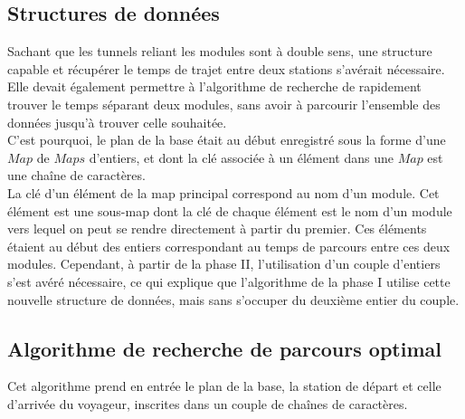 \documentclass[11pt, a4paper, twoside, titlepage]{article}
\begin{document}
\subsection{Structures de données}

Sachant que les tunnels reliant les modules sont à double sens, une structure capable et récupérer le temps de trajet entre deux stations s'avérait nécessaire. Elle devait également permettre à l'algorithme de recherche de rapidement trouver le temps séparant deux modules, sans avoir à parcourir l'ensemble des données jusqu'à trouver celle souhaitée.\\
C'est pourquoi, le plan de la base était au début enregistré sous la forme d'une $Map$ de $Maps$ d'entiers, et dont la clé associée à un élément dans une $Map$ est une chaîne de caractères.\\

La clé d'un élément de la map principal correspond au nom d'un module. Cet élément est une sous-map dont la clé de chaque élément est le nom d'un module vers lequel on peut se rendre directement à partir du premier. Ces éléments étaient au début des entiers correspondant au temps de parcours entre ces deux modules. Cependant, à partir de la phase II, l'utilisation d'un couple d'entiers s'est avéré nécessaire, ce qui explique que l'algorithme de la phase I utilise cette nouvelle structure de données, mais sans s'occuper du deuxième entier du couple.\\


\subsection{Algorithme de recherche de parcours optimal}

Cet algorithme prend en entrée le plan de la base, la station de départ et celle d'arrivée du voyageur, inscrites dans un couple de chaînes de caractères.\\
\end{document}
